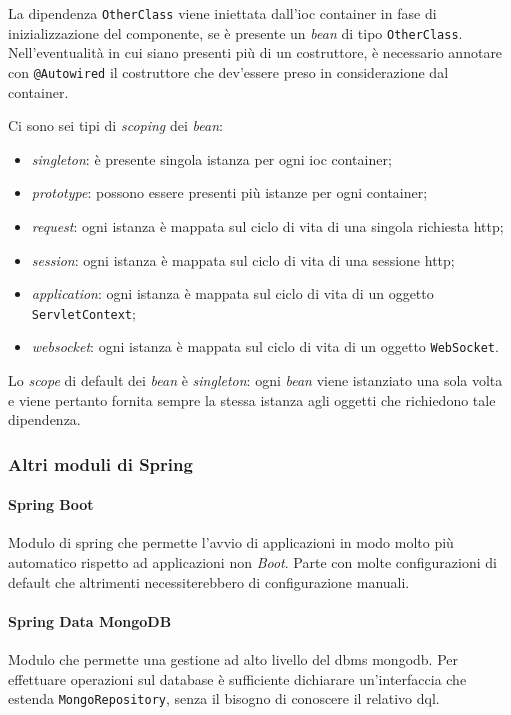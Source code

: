La dipendenza \texttt{OtherClass} viene iniettata dall'\gls{ioc} container in fase di inizializzazione del componente, se è presente un \textit{bean} di tipo \texttt{OtherClass}.
Nell'eventualità in cui siano presenti più di un costruttore, è necessario annotare con \texttt{@Autowired} il costruttore che dev'essere preso in considerazione dal container.

Ci sono sei tipi di \textit{scoping} dei \textit{bean}:
\begin{itemize}
	\item \textit{singleton}: è presente singola istanza per ogni \gls{ioc} container;
	\item \textit{prototype}: possono essere presenti più istanze per ogni container;
	\item \textit{request}: ogni istanza è mappata sul ciclo di vita di una singola richiesta \acrshort{http};
	\item \textit{session}: ogni istanza è mappata sul ciclo di vita di una sessione \acrshort{http};
	\item \textit{application}: ogni istanza è mappata sul ciclo di vita di un oggetto \texttt{ServletContext};
	\item \textit{websocket}: ogni istanza è mappata sul ciclo di vita di un oggetto \texttt{WebSocket}.
\end{itemize}

Lo \textit{scope} di default dei \textit{bean} è \textit{singleton}: ogni \textit{bean} viene istanziato una sola volta e viene pertanto fornita sempre la stessa istanza agli oggetti che richiedono tale dipendenza.

\subsubsection{Altri moduli di Spring}

\paragraph*{Spring Boot} Modulo di \gls{spring} che permette l'avvio di applicazioni in modo molto più automatico rispetto ad applicazioni non \textit{Boot}. Parte con molte configurazioni di default che altrimenti necessiterebbero di configurazione manuali.

\paragraph*{Spring Data MongoDB} Modulo che permette una gestione ad alto livello del \acrshort{dbms} \gls{mongodb}.
Per effettuare operazioni sul database è sufficiente dichiarare un'interfaccia che estenda \texttt{MongoRepository}, senza il bisogno di conoscere il relativo \gls{dql}.

